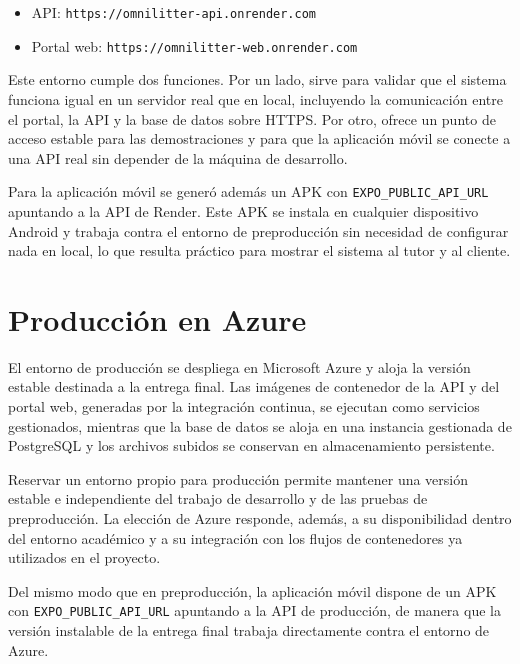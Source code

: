 \begin{itemize}
  \item API: \texttt{https://omnilitter-api.onrender.com}
  \item Portal web: \texttt{https://omnilitter-web.onrender.com}
\end{itemize}

Este entorno cumple dos funciones. Por un lado, sirve para validar que el sistema
funciona igual en un servidor real que en local, incluyendo la comunicación entre el
portal, la API y la base de datos sobre HTTPS. Por otro, ofrece un punto de acceso
estable para las demostraciones y para que la aplicación móvil se conecte a una API
real sin depender de la máquina de desarrollo.

Para la aplicación móvil se generó además un APK con \texttt{EXPO\_PUBLIC\_API\_URL}
apuntando a la API de Render. Este APK se instala en cualquier dispositivo Android y
trabaja contra el entorno de preproducción sin necesidad de configurar nada en local,
lo que resulta práctico para mostrar el sistema al tutor y al cliente.

\section{Producción en Azure}

El entorno de producción se despliega en Microsoft Azure y aloja la versión estable
destinada a la entrega final. Las imágenes de contenedor de la API y del portal web,
generadas por la integración continua, se ejecutan como servicios gestionados, mientras
que la base de datos se aloja en una instancia gestionada de PostgreSQL y los archivos
subidos se conservan en almacenamiento persistente.

Reservar un entorno propio para producción permite mantener una versión estable e
independiente del trabajo de desarrollo y de las pruebas de preproducción. La elección
de Azure responde, además, a su disponibilidad dentro del entorno académico y a su
integración con los flujos de contenedores ya utilizados en el proyecto.

Del mismo modo que en preproducción, la aplicación móvil dispone de un APK con
\texttt{EXPO\_PUBLIC\_API\_URL} apuntando a la API de producción, de manera que la
versión instalable de la entrega final trabaja directamente contra el entorno de Azure.

